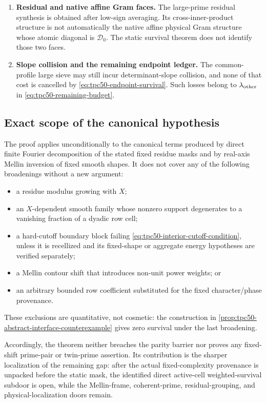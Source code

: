 \begin{enumerate}[label=\textup{(\roman*)},leftmargin=2.6em]
 \item \textbf{Residual and native affine Gram faces.}
 The large-prime residual synthesis is obtained after low-sign
 averaging.  Its cross-inner-product structure is not automatically
 the native affine physical Gram structure whose atomic diagonal is
 \(\mathcal D_0\).  The static survival theorem does not identify those
 two faces.

 \item \textbf{Slope collision and the remaining endpoint ledger.}
 The common-profile large sieve may still incur determinant-slope
 collision, and none of that cost is cancelled by
 \eqref{eq:tpc50-endpoint-survival}.  Such losses belong to
 \(\lambda_{\rm other}\) in \eqref{eq:tpc50-remaining-budget}.
\end{enumerate}

\subsection{Exact scope of the canonical hypothesis}

The proof applies unconditionally to the canonical terms produced by
direct finite Fourier decomposition of the stated fixed residue masks
and by real-axis Mellin inversion of fixed smooth shapes.  It does not
cover any of the following broadenings without a new argument:
\begin{itemize}
 \item a residue modulus growing with \(X\);
 \item an \(X\)-dependent smooth family whose nonzero support degenerates
       to a vanishing fraction of a dyadic row cell;
 \item a hard-cutoff boundary block failing
       \eqref{eq:tpc50-interior-cutoff-condition}, unless it is
       recellized and its fixed-shape or aggregate energy hypotheses are
       verified separately;
 \item a Mellin contour shift that introduces non-unit power weights;
       or
 \item an arbitrary bounded row coefficient substituted for the fixed
       character/phase provenance.
\end{itemize}
These exclusions are quantitative, not cosmetic: the construction in
\cref{prop:tpc50-abstract-interface-counterexample} gives zero survival
under the last broadening.

Accordingly, the theorem neither breaches the parity barrier nor proves
any fixed-shift prime-pair or twin-prime assertion.  Its contribution is
the sharper localization of the remaining gap: after the actual
fixed-complexity provenance is unpacked before the static mask, the
identified direct active-cell weighted-survival subdoor is open, while
the Mellin-frame, coherent-prime, residual-grouping, and
physical-localization doors remain.

